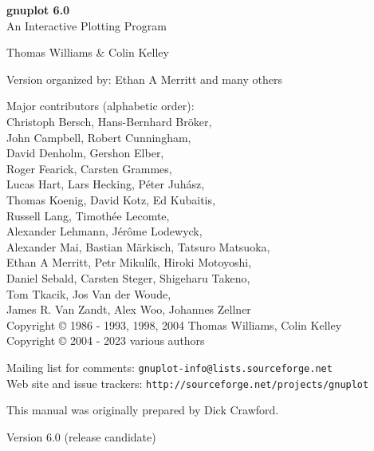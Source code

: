 \documentclass[10pt,twoside]{article}
\def\gpVersion{6.0}
\def\gnuplotVersion{\usebox\GpVersion}
\begin{document}
\sloppy
\thispagestyle{empty}
\rule{0in}{1.0in}

  \begin{center}

  {\huge\bf {gnuplot \gpVersion}}\\
  \vspace{3ex}
  {\Large An Interactive Plotting Program}\\

  \vspace{2ex}

  \large
  Thomas Williams \& Colin Kelley\\

  \vspace{2ex}

  Version
    {\gnuplotVersion }
  organized by: Ethan A Merritt and many others\\

   \vspace{2ex}

  Major contributors (alphabetic order):\\

  Christoph Bersch,
  Hans-Bernhard Bröker,\\
  John Campbell,
  Robert Cunningham,\\
  David Denholm,
  Gershon Elber,\\
  Roger Fearick,
  Carsten Grammes,\\
  Lucas Hart,
  Lars Hecking,
  Péter Juhász,\\
  Thomas Koenig,
  David Kotz,
  Ed Kubaitis,\\
  Russell Lang,
  Timothée Lecomte,\\
  Alexander Lehmann,
  Jérôme Lodewyck,\\
  Alexander Mai,
  Bastian Märkisch,
  Tatsuro Matsuoka, \\
  Ethan A Merritt,
  Petr Mikulík,
  Hiroki Motoyoshi, \\
  Daniel Sebald,
  Carsten Steger,
  Shigeharu Takeno,\\
  Tom Tkacik,
  Jos Van der Woude,\\
  James R. Van Zandt,
  Alex Woo,
  Johannes Zellner\\
  Copyright {\copyright} 1986 - 1993, 1998, 2004   Thomas Williams, Colin Kelley\\
  Copyright {\copyright} 2004 - 2023  various authors\\

  \vspace{2ex}

  Mailing list for comments: \verb+gnuplot-info@lists.sourceforge.net+\\
  Web site and issue trackers: \verb+http://sourceforge.net/projects/gnuplot+

  \vfill
  This manual was originally prepared by Dick Crawford. \\

  \vspace{2ex}

   Version {\gpVersion} (release candidate)

   \end{center}
\newpage


\hypertarget{TableOfContents}{}
\tableofcontents

\newpage
\end{document}
